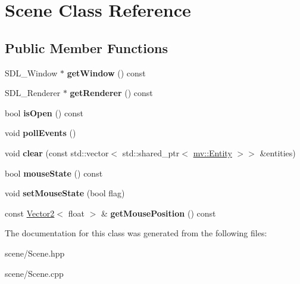 \hypertarget{class_scene}{}\section{Scene Class Reference}
\label{class_scene}
\subsection*{Public Member Functions}
\begin{DoxyCompactItemize}
\item 
\mbox{\label{class_scene_a25f8bfdf43742caa7209f74a82356b31}} 
S\+D\+L\+\_\+\+Window $\ast$ {\bfseries get\+Window} () const
\item 
\mbox{\label{class_scene_a2c0b5af09495ff8af64fb3c52197f49e}} 
S\+D\+L\+\_\+\+Renderer $\ast$ {\bfseries get\+Renderer} () const
\item 
\mbox{\label{class_scene_a1b5e495f69d81182bb6dcaebd1edb669}} 
bool {\bfseries is\+Open} () const
\item 
\mbox{\label{class_scene_a41ccb2e0cc9a19faa18ec22a21c06372}} 
void {\bfseries poll\+Events} ()
\item 
\mbox{\label{class_scene_a08d36ca08f508e6a75fc115415c71934}} 
void {\bfseries clear} (const std\+::vector$<$ std\+::shared\+\_\+ptr$<$ \mbox{\hyperlink{classmv_1_1_entity}{mv\+::\+Entity}} $>$$>$ \&entities)
\item 
\mbox{\label{class_scene_a2ce3780f0b8caef89e72a2b8fbde3a33}} 
bool {\bfseries mouse\+State} () const
\item 
\mbox{\label{class_scene_a169950f4ad086061546e2ce23d799487}} 
void {\bfseries set\+Mouse\+State} (bool flag)
\item 
\mbox{\label{class_scene_a57a096711a009b7205069b2afd57d778}} 
const \mbox{\hyperlink{class_vector2}{Vector2}}$<$ float $>$ \& {\bfseries get\+Mouse\+Position} () const
\end{DoxyCompactItemize}


The documentation for this class was generated from the following files\+:\begin{DoxyCompactItemize}
\item 
scene/Scene.\+hpp\item 
scene/Scene.\+cpp\end{DoxyCompactItemize}
